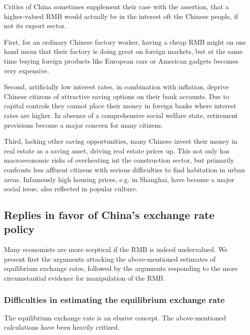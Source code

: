 \documentclass[11pt]{article}
\begin{document}
Critics of China sometimes supplement their case with the assertion, that a higher-valued RMB would actually be in the interest oft the Chinese people, if not its export sector.

First, for an ordinary Chinese factory worker, having a cheap RMB might on one hand mean that their factory 
is doing great on foreign markets, but at the same time buying foreign 
products like European cars or American gadgets becomes very expensive. 

Second, artificially low interest rates, in combination with inflation, deprive Chinese citizens of attractive saving options on their bank accounts. Due to capital controls they cannot place their money in foreign banks where interest rates are higher. In absence of a comprehensive social welfare state, retirement provisions become a major concern for many citizens.

Third, lacking other saving opportunities, many Chinese invest their money in real estate as a saving asset, driving real estate prices up. This not only has macroeconomic risks of overheating int the construction sector, but primarily confronts less affluent citizens with serious difficulties to find habitation in urban areas. Infamously high housing prices, e.g. in Shanghai, have become a major social issue, also reflected in popular culture. %



\subsection{Replies in favor of China's exchange rate policy}

Many economists are more sceptical if the RMB is indeed undervalued. We present first the arguments attacking the above-mentioned estimates of equilibrium exchange rates, followed by the arguments responding to the more circumstantial evidence for manipulation of the RMB.

\subsubsection{Difficulties in estimating the equilibrium exchange rate}

The equilibrium exchange rate is an elusive concept. The above-mentioned calculations have been heavily critized.
\end{document}

